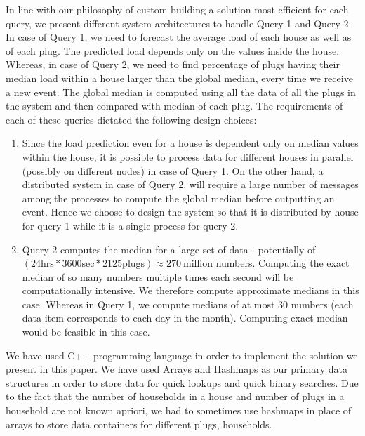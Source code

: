 In line with our philosophy of custom building a solution most efficient for each query, we present different system architectures to handle Query 1 and Query 2.
In case of Query 1, we need to forecast the average load of each house as well as of each plug.
The predicted load depends only on the values inside the house.
Whereas, in case of Query 2, we need to find percentage of plugs having their median load within a house larger than the global median, every time we receive a new event.
The global median is computed using all the data of all the plugs in the system and then compared with median of each plug.
The requirements of each of these queries dictated the following design choices:

\begin{enumerate}
\item Since the load prediction even for a house is dependent only on median values within the house, it is possible to process data for different houses in parallel (possibly on different nodes) in case of Query 1.
On the other hand, a distributed system in case of Query 2, will require a large number of messages among the processes to compute the global median before outputting an event.
Hence we choose to design the system so that it is distributed by house for query 1 while it is a single process for query 2.

\item Query 2 computes the median for a large set of data - potentially  of $(24 \mbox{hrs} * 3600 \mbox{sec} * 2125 \mbox{plugs}) \approx 270 \ \mbox{million}$ numbers.
Computing the exact median of so many numbers multiple times each second will be computationally intensive.
We therefore compute approximate medians in this case.
Whereas in Query 1, we compute medians of at most 30 numbers (each data item corresponds to each day in the month).
Computing exact median would be feasible in this case.
\end{enumerate}

We have used C++ programming language in order to implement the solution we present in this paper.
We have used Arrays and Hashmaps as our primary data structures in order to store data for quick lookups and quick binary searches.
Due to the fact that the number of households in a house and number of plugs in a household are not known apriori, we had to sometimes use hashmaps in place of arrays to store data containers for different plugs, households.
